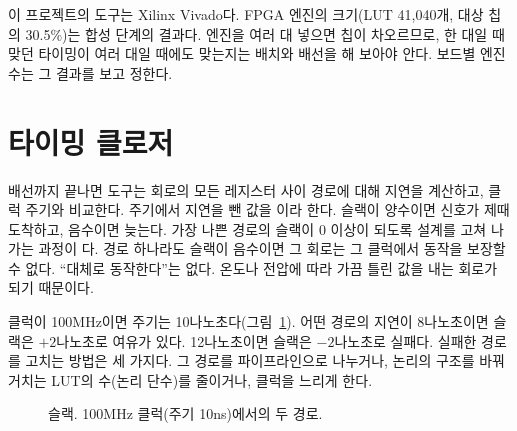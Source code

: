 \Ours 이 프로젝트의 도구는 Xilinx Vivado다. FPGA 엔진의 크기(LUT 41,040개, 대상 칩의 30.5\%)는 합성
단계의 결과다. 엔진을 여러 대 넣으면 칩이 차오르므로, 한 대일 때 맞던 타이밍이 여러 대일 때에도 맞는지는
배치와 배선을 해 보아야 안다. 보드별 엔진 수는 그 결과를 보고 정한다.

\section{타이밍 클로저}\label{sec:timing}

\Why 배선까지 끝나면 도구는 회로의 모든 레지스터 사이 경로에 대해 지연을 계산하고, 클럭 주기와 비교한다.
주기에서 지연을 뺀 값을 이라 한다. 슬랙이 양수이면 신호가 제때 도착하고, 음수이면
늦는다. 가장 나쁜 경로의 슬랙이 0 이상이 되도록 설계를 고쳐 나가는 과정이
다. 경로 하나라도 슬랙이 음수이면 그 회로는 그 클럭에서 동작을 보장할
수 없다. ``대체로 동작한다''는 없다. 온도나 전압에 따라 가끔 틀린 값을 내는 회로가 되기 때문이다.

\General 클럭이 100MHz이면 주기는 10나노초다(그림~\ref{fig:g-slack}). 어떤 경로의 지연이 8나노초이면
슬랙은 $+2$나노초로 여유가 있다. 12나노초이면 슬랙은 $-2$나노초로 실패다. 실패한 경로를 고치는 방법은
세 가지다. 그 경로를 파이프라인으로 나누거나, 논리의 구조를 바꿔 거치는 LUT의 수(논리 단수)를 줄이거나,
클럭을 느리게 한다.

\begin{figure}[ht]
\centering
{}
\caption{슬랙. 100MHz 클럭(주기 10ns)에서의 두 경로.}
\label{fig:g-slack}
\end{figure}

